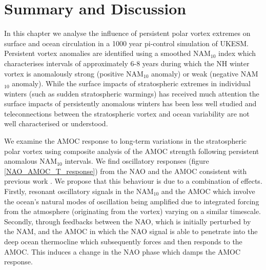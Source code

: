 \section{Summary and Discussion}

In this chapter we analyse the influence of persistent polar vortex extremes on surface and ocean circulation in a 1000 year pi-control simulation of UKESM. Persistent vortex anomalies are identified using a smoothed NAM$_{10}$ index which characterises intervals of approximately 6-8 years during which the NH winter vortex is anomalously strong (positive NAM$_{10}$ anomaly) or weak (negative NAM$_{10}$ anomaly). While the surface impacts of stratospheric extremes in individual winters (such as sudden stratospheric warmings) has received much attention \citep{baldwinStratospheric2001a, domeisenEstimating2019, charlton-perezInfluence2018a} the surface impacts of persistently anomalous winters has been less well studied and  teleconnections between the stratospheric vortex and ocean variability are not well characterised or understood. 

We examine the AMOC response to long-term variations in the stratospheric polar vortex using composite analysis of the AMOC strength following persistent anomalous NAM$_{10}$ intervals. We find oscillatory responses (figure \ref{NAO_AMOC_T_response}) from the NAO and the AMOC consistent with previous work  \citep{reichlerStratospheric2012}. We propose that this behaviour is due to a combination of effects. Firstly, resonant oscillatory signals in the NAM$_{10}$ and the AMOC which involve the ocean's natural modes of oscillation being amplified due to integrated forcing from the atmosphere (originating from the vortex) varying on a similar timescale. Secondly, through feedbacks between the NAO, which is initially perturbed by the NAM, and the AMOC in which the NAO signal is able to penetrate into the deep ocean thermocline which subsequently forces and then responds to the AMOC. This induces a change in the NAO phase which damps the AMOC response.

